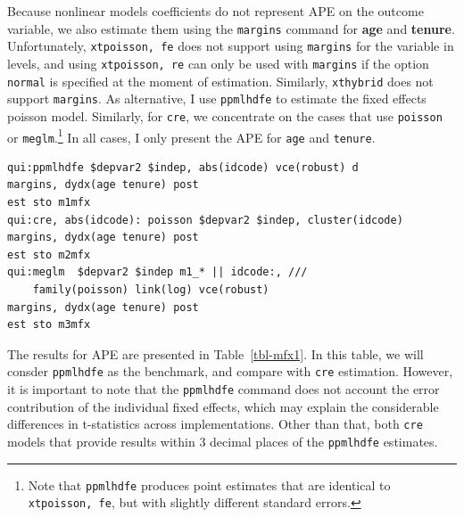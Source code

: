 \documentclass[bib]{statapress}
\begin{document}
Because nonlinear models coefficients do not represent APE on the
outcome variable, we also estimate them using the \texttt{margins}
command for \textbf{age} and \textbf{tenure}. Unfortunately,
\texttt{xtpoisson,\ fe} does not support using \texttt{margins} for the
variable in levels, and using \texttt{xtpoisson,\ re} can only be used
with \texttt{margins} if the option \texttt{normal} is specified at the
moment of estimation. Similarly, \texttt{xthybrid} does not support
\texttt{margins}. As alternative, I use
\texttt{ppmlhdfe}\citep{correia2020} to estimate the fixed effects
poisson model. Similarly, for \texttt{cre}, we concentrate on the cases
that use \texttt{poisson} or \texttt{meglm}.\footnote{Note that
  \texttt{ppmlhdfe} produces point estimates that are identical to
  \texttt{xtpoisson,\ fe}, but with slightly different standard errors.}
In all cases, I only present the APE for \texttt{age} and
\texttt{tenure}.

\begin{verbatim}
qui:ppmlhdfe $depvar2 $indep, abs(idcode) vce(robust) d
margins, dydx(age tenure) post  
est sto m1mfx
qui:cre, abs(idcode): poisson $depvar2 $indep, cluster(idcode)
margins, dydx(age tenure) post  
est sto m2mfx
qui:meglm  $depvar2 $indep m1_* || idcode:, ///
    family(poisson) link(log) vce(robust)
margins, dydx(age tenure) post  
est sto m3mfx
\end{verbatim}

The results for APE are presented in Table~\ref{tbl-mfx1}. In this
table, we will consder \texttt{ppmlhdfe} as the benchmark, and compare
with \texttt{cre} estimation. However, it is important to note that the
\texttt{ppmlhdfe} command does not account the error contribution of the
individual fixed effects, which may explain the considerable differences
in t-statistics across implementations. Other than that, both
\texttt{cre} models that provide results within 3 decimal places of the
\texttt{ppmlhdfe} estimates.
\end{document}
